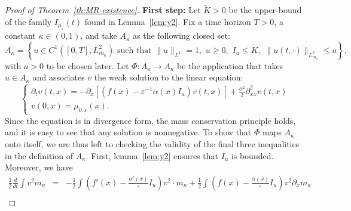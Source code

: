 \documentclass[onefignum,onetabnum]{siamart190516}
\newcommand{\1}{\mathbbm{1}}
\newcommand{\eps}{\varepsilon}
\begin{document}
\begin{proof}[Proof of Theorem~\ref{th:MR-existence}]
\noindent\textbf{First step:} Let $\tilde K>0$ be the upper-bound of the family $I_{\mu_\eps}(t)$ found in Lemma~\ref{lem:y2}. Fix a time horizon $T>0$, a constant $\kappa\in(0,1)$, and take $A_\kappa$ as the following closed set:
$$
A_\kappa = \left\{u\in C^1([0,T],L^2_{m_\kappa})\text{ such that }\|u\|_{L^1}=1,\,\,u\geq0,\,\,I_u\leq \tilde K,\,\,\|u(t,\cdot)\|_{L^2_{m_\kappa}}\leq a\right\},
$$
with $a>0$ to be chosen later. Let $\Phi:A_\kappa\rightarrow A_\kappa$ be the application that takes $u\in A_\kappa$ and associates $v$ the weak solution to the linear equation:
$$
\begin{cases}
\partial_tv(t,x) = -\partial_x\left[\left(f(x)-\eps^{-1}\alpha(x)I_u \right)v(t,x)\right]+\frac{\sigma^2}{2}\partial^2_{xx}v(t,x)
\\
v(0,x) = \mu_{0,\eps}(x).
\end{cases}
$$
Since the equation is in divergence form, the mass conservation principle holds, and it is easy to see that any solution is nonnegative. To show that $\Phi$ maps $A_\kappa$ onto itself, we are thus left to checking the validity of the final three inequalities in the definition of $A_\kappa$. First, lemma~\ref{lem:y2} ensures that $I_u$ is bounded. Moreover, we have
\begin{eqnarray*}
\frac12\frac{d}{dt}\int v^2{m_\kappa}  
&=&-\frac12\int \left(f'(x)-\frac{\alpha'(x)}{\eps}I_u \right)v^2\cdot {m_\kappa}+\frac12\int \left(f(x)-\frac{\alpha(x)}{\eps}I_u \right)v^2 \partial_x{m_\kappa}\\

\end{eqnarray*}
\end{proof}
\end{document}

